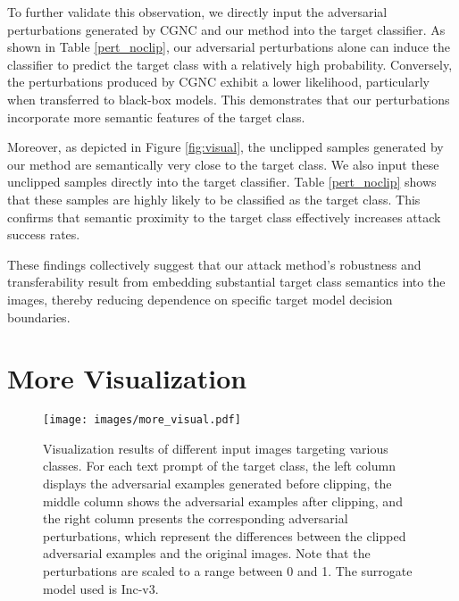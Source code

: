 To further validate this observation, we directly input the adversarial perturbations generated by CGNC and our method into the target classifier. As shown in Table \ref{pert_noclip}, our adversarial perturbations alone can induce the classifier to predict the target class with a relatively high probability. Conversely, the perturbations produced by CGNC exhibit a lower likelihood, particularly when transferred to black-box models. This demonstrates that our perturbations incorporate more semantic features of the target class.

Moreover, as depicted in Figure \ref{fig:visual}, the unclipped samples generated by our method are semantically very close to the target class. We also input these unclipped samples directly into the target classifier. Table \ref{pert_noclip} shows that these samples are highly likely to be classified as the target class. This confirms that semantic proximity to the target class effectively increases attack success rates.

These findings collectively suggest that our attack method's robustness and transferability result from embedding substantial target class semantics into the images, thereby reducing dependence on specific target model decision boundaries.


\section{More Visualization}

\begin{figure*}[ht!]
\vskip 0.2in
\begin{center}
\centerline{\texttt{[image: images/more\_visual.pdf]}}
\caption{Visualization results of different input images targeting various classes. For each text prompt of the target class, the left column displays the adversarial examples generated before clipping, the middle column shows the adversarial examples after clipping, and the right column presents the corresponding adversarial perturbations, which represent the differences between the clipped adversarial examples and the original images. Note that the perturbations are scaled to a range between 0 and 1. The surrogate model used is Inc-v3.}

\label{fig:more_visual}
\end{center}
\vskip -0.2in
\end{figure*}
